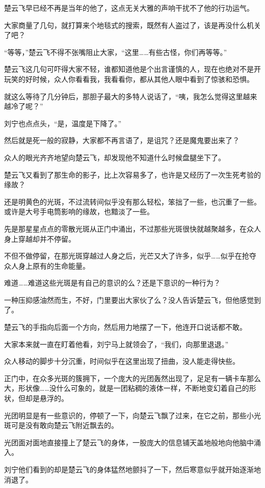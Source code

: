 楚云飞早已经不再是当年的他了，这点无关大雅的声响干扰不了他的行功运气。

大家商量了几句，就打算来个地毯式的搜索，既然有人盗过了，该是再没什么机关了吧？

“等等，”楚云飞不得不张嘴阻止大家，“这里……有些古怪，你们再等等。”

楚云飞这几句可吓得大家不轻，谁都知道他是个出言谨慎的人，现在也绝对不是开玩笑的好时候，众人你看看我，我看看你，都从其他人眼中看到了惊骇和恐惧。

就这么等待了几分钟后，那胆子最大的多特人说话了，“咦，我怎么觉得这里越来越冷了呢？”

刘宁也点点头，“是，温度是下降了。”

然后就是死一般的寂静，大家都不再言语了，是诅咒？还是魔鬼要出来了？

众人的眼光齐齐地望向楚云飞，却发现他不知道什么时候盘腿坐下了。

楚云飞又看到了那生命的影子，比上次容易多了，也许是又经历了一次生死考验的缘故？

还是明黄色的光斑，不过流转间似乎没有那么轻松，笨拙了一些，也沉重了一些。或许是大号手电筒影响的缘故，也黯淡了一些。

先是那星星点点的零散光斑从正门中涌出，不过那些光斑很快就越聚越多，在众人身上穿越却并不停留。

不但不做停留，在那光斑穿越过人身之后，光芒又大了许多，似乎……似乎在抢夺众人身上原有的生命能量。

难道……难道这些光斑是有自己的意识的么？还是下意识的一种行为？

一种压抑感油然而生，不好，门里要出大家伙了么？没人告诉楚云飞，但他感觉到了。

楚云飞的手指向后面一个方向，然后用力地摆了一下，他连开口说话都不敢。

大家本来就一直在盯着他看，刘宁马上就领会了，“我们，向那里退退。”

众人移动的脚步十分沉重，时间似乎在这里出现了扭曲，没人能走得快些。

正门中，在众多光斑的簇拥下，一个庞大的光团轰然出现了，足足有一辆卡车那么大，形状像……没什么可象的，就是一团粘稠的液体一样，不断地变幻着自己的形状，但却是悬浮的。

光团明显是有一些意识的，停顿了一下，向楚云飞飘了过来，在它之前，那些小光斑可是没有敢向楚云飞附近飘去的。

光团面对面地直接撞上了楚云飞的身体，一股庞大的信息铺天盖地般地向他脑中涌入。

刘宁他们看到的却是楚云飞的身体猛然地颤抖了一下，然后寒意似乎就开始逐渐地消退了。

